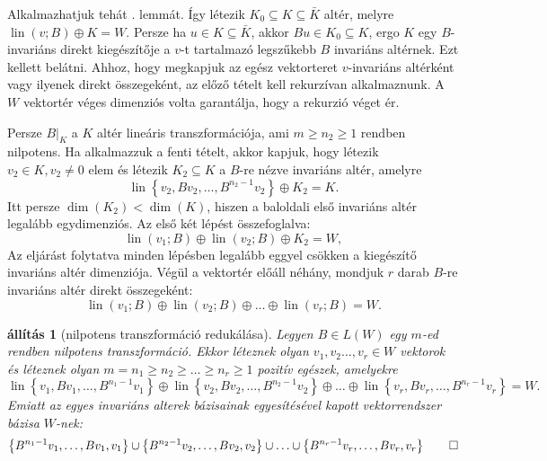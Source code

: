 \documentclass[a4paper, showtrims]{memoir}
\makeatletter
\renewenvironment{proof}[1][\proofname]
    {\par\pushQED{\qed}%
    \normalfont \topsep6\p@\@plus6\p@\relax
    \trivlist
    \item[\hskip\labelsep
        \itshape
    #1\@addpunct{:}]\ignorespaces}
    {\popQED\endtrivlist\@endpefalse}
\theoremstyle{plain}
\newtheorem{proposition}{állítás}[chapter]
\theoremstyle{remark}
\theoremstyle{definition}
\DeclareMathOperator{\lin}{lin}
\makeatother
\begin{document}
\begin{proof}
    Alkalmazhatjuk tehát . lemmát.
	Így létezik $K_0\subseteq K\subseteq\bar{K}$ altér, melyre $\lin(v;B)\oplus K=W.$
	Persze ha $u\in K\subseteq\bar{K}$, akkor $Bu\in K_0\subseteq K$, ergo $K$ egy $B$-invariáns direkt kiegészítője a
	$v$-t tartalmazó legszűkebb $B$ invariáns altérnek.
	Ezt kellett belátni.
\end{proof}
Ahhoz, hogy megkapjuk az egész vektorteret $v$-invariáns altérként vagy ilyenek direkt összegeként, az előző tételt
kell rekurzívan alkalmaznunk.
A $W$ vektortér véges dimenziós volta garantálja, hogy a rekurzió véget ér.

Persze $B|_K$ a $K$ altér lineáris transzformációja,
ami $m\geq n_2\geq 1$ rendben nilpotens.
Ha alkalmazzuk a fenti tételt, akkor kapjuk,
hogy létezik $v_2\in K, v_2\neq 0$ elem és létezik $K_2\subseteq K$ a $B$-re nézve invariáns altér,
amelyre
\[
	\lin\left\{ v_2,Bv_2,\ldots,B^{n_2-1}v_2 \right\}
	\oplus
	K_2=K.
\]
Itt persze $\dim(K_2)<\dim(K)$, hiszen a baloldali első invariáns altér legalább egydimenziós.
Az első két lépést összefoglalva:
\[
	\lin(v_1;B)
	\oplus
	\lin(v_2;B)
	\oplus
	K_2=W,
\]
Az eljárást folytatva minden lépésben legalább eggyel csökken a kiegészítő invariáns altér dimenziója.
Végül a vektortér előáll néhány, mondjuk $r$ darab $B$-re invariáns altér direkt összegeként:
\[
	\lin(v_1;B)
	\oplus
	\lin(v_2;B)
	\oplus
	\ldots
    \oplus
	\lin(v_r;B)
	=W.
\]
\begin{proposition}[nilpotens transzformáció redukálása]
	Legyen $B\in L\left( W \right)$ egy $m$-ed rendben nilpotens transzformáció.
	Ekkor léteznek olyan $v_1,v_2\dots,v_r\in W$ vektorok és
	léteznek olyan $m=n_1\geq n_2\geq \dots\geq n_r\geq 1$ pozitív egészek,
	amelyekre
	\[
		\lin\left\{ v_1,Bv_1,\ldots,B^{n_1-1}v_1 \right\}
		\oplus
		\lin\left\{ v_2,Bv_2,\ldots,B^{n_2-1}v_2 \right\}
		\oplus
		\ldots
		\oplus
		\lin\left\{ v_r,Bv_r,\ldots,B^{n_r-1}v_r \right\}
		=
		W.
	\]
	Emiatt az egyes invariáns alterek bázisainak egyesítésével kapott vektorrendszer bázisa $W$-nek:
	\[
		\left\{ B^{n_1-1}v_1,\ldots,Bv_1,v_1 \right\}
		\cup
		\left\{ B^{n_2-1}v_2,\ldots,Bv_2,v_2 \right\}
		\cup
		\ldots
		\cup
		\left\{ B^{n_r-1}v_r,\ldots,Bv_r,v_r \right\}
		\qedhere
	\]
\end{proposition}
\end{document}
